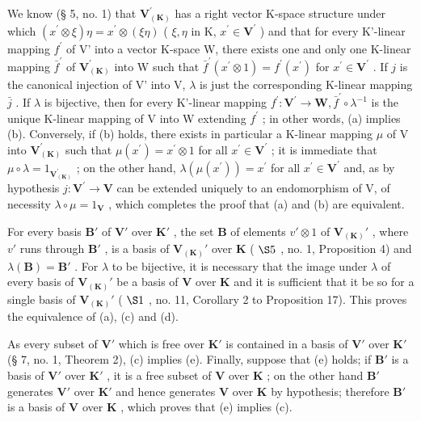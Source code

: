 We know (§ 5, no. 1) that \(\mathbf{V}_{(\mathbf{K})}^{\prime}\) has a right vector K-space structure under which \((x^{\prime} \otimes \xi)\eta = x^{\prime} \otimes (\xi\eta)\) ( \(\xi, \eta\) in K, \(x^{\prime} \in \mathbf{V}^{\prime}\) ) and that for every K'-linear mapping \(f^{\prime}\) of V' into a vector K-space W, there exists one and only one K-linear mapping \(\bar{f}^{\prime}\) of \(\mathbf{V}_{(\mathbf{K})}^{\prime}\) into W such that \(\bar{f}^{\prime}(x^{\prime} \otimes 1) = f^{\prime}(x^{\prime})\) for \(x^{\prime} \in \mathbf{V}^{\prime}\) . If \(j\) is the canonical injection of V' into V, \(\lambda\) is just the corresponding K-linear mapping \(\bar{j}\) . If \(\lambda\) is bijective, then for every K'-linear mapping \(f^{\prime}: \mathbf{V}^{\prime} \to \mathbf{W}, \bar{f}^{\prime} \circ \lambda^{-1}\) is the unique K-linear mapping of V into W extending \(f^{\prime}\) ; in other words, (a) implies (b). Conversely, if (b) holds, there exists in particular a K-linear mapping \(\mu\) of V into \(\mathbf{V}_{(\mathbf{K})}^{\prime}\) such that \(\mu(x^{\prime}) = x^{\prime} \otimes 1\) for all \(x^{\prime} \in \mathbf{V}^{\prime}\) ; it is immediate that \(\mu \circ \lambda = 1_{\mathbf{V}_{(\mathbf{K})}^{\prime}}\) ; on the other hand, \(\lambda(\mu(x^{\prime})) = x^{\prime}\) for all \(x^{\prime} \in \mathbf{V}^{\prime}\) and, as by hypothesis \(j: \mathbf{V}^{\prime} \to \mathbf{V}\) can be extended uniquely to an endomorphism of V, of necessity \(\lambda \circ \mu = 1_{\mathbf{V}}\) , which completes the proof that (a) and (b) are equivalent.

For every basis \(\mathbf{B}'\) of \(\mathbf{V}'\) over \(\mathbf{K}'\) , the set \(\mathbf{B}\) of elements \(v' \otimes 1\) of \(\mathbf{V}_{(\mathbf{K})}'\) , where \(v'\) runs through \(\mathbf{B}'\) , is a basis of \(\mathbf{V}_{(\mathbf{K})}'\) over \(\mathbf{K}\) ( \(\S 5\) , no. 1, Proposition 4) and \(\lambda(\mathbf{B}) = \mathbf{B}'\) . For \(\lambda\) to be bijective, it is necessary that the image under \(\lambda\) of every basis of \(\mathbf{V}_{(\mathbf{K})}'\) be a basis of \(\mathbf{V}\) over \(\mathbf{K}\) and it is sufficient that it be so for a single basis of \(\mathbf{V}_{(\mathbf{K})}'\) ( \(\S 1\) , no. 11, Corollary 2 to Proposition 17). This proves the equivalence of (a), (c) and (d).

As every subset of \(\mathbf{V}'\) which is free over \(\mathbf{K}'\) is contained in a basis of \(\mathbf{V}'\) over \(\mathbf{K}'\) (§ 7, no. 1, Theorem 2), (c) implies (e). Finally, suppose that (e) holds; if \(\mathbf{B}'\) is a basis of \(\mathbf{V}'\) over \(\mathbf{K}'\) , it is a free subset of \(\mathbf{V}\) over \(\mathbf{K}\) ; on the other hand \(\mathbf{B}'\) generates \(\mathbf{V}'\) over \(\mathbf{K}'\) and hence generates \(\mathbf{V}\) over \(\mathbf{K}\) by hypothesis; therefore \(\mathbf{B}'\) is a basis of \(\mathbf{V}\) over \(\mathbf{K}\) , which proves that (e) implies (c).

